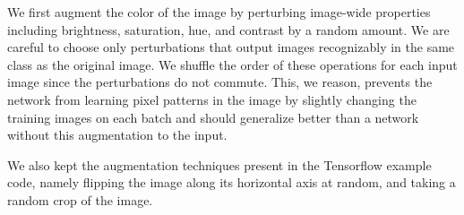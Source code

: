 We first augment the color of the image by perturbing image-wide properties including  brightness, saturation, hue, and contrast by a random amount. We are careful to choose only perturbations that output images recognizably in the same class as the original image. We shuffle the order of these operations for each input image since the perturbations do not commute. This, we reason, prevents the network from learning pixel patterns in the image by slightly changing the training images on each batch and should generalize better than a network without this augmentation to the input. 

We also kept the augmentation techniques present in the Tensorflow example code, namely flipping the image along its horizontal axis at random, and taking a random crop of the image.

